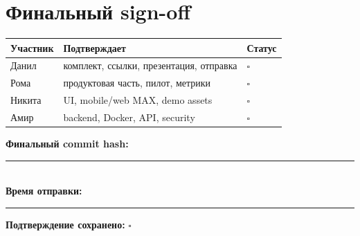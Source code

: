 \documentclass[11pt,a4paper]{article}
\begin{document}
\section{Финальный sign-off}
\begin{tabularx}{\textwidth}{p{27mm}X p{28mm}}\toprule Участник & Подтверждает & Статус\\\midrule
Данил & комплект, ссылки, презентация, отправка & $\square$\\
Рома & продуктовая часть, пилот, метрики & $\square$\\
Никита & UI, mobile/web MAX, demo assets & $\square$\\
Амир & backend, Docker, API, security & $\square$\\\bottomrule\end{tabularx}
\vspace{4mm}\begin{goalbox}\textbf{Финальный commit hash:} \rule{75mm}{0.4pt}\\[2mm]\textbf{Время отправки:} \rule{45mm}{0.4pt}\quad \textbf{Подтверждение сохранено:} $\square$\end{goalbox}
\end{document}
